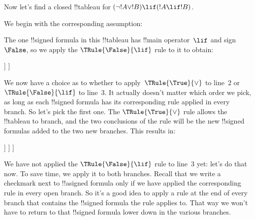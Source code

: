 \begin{ex}
Now let's find a closed !!{tableau} for $(\lnot !A \lor !B) \lif (!A
\lif !B)$.

We begin with the corresponding assumption:
\begin{oltableau}
  [\sFmla{\False}{(\lnot \formula{A} \lor \formula{B}) \lif
      (\formula{A} \lif \formula{B})}, just=\TAss]
\end{oltableau}
The one !!{signed formula} in this !!{tableau} has !!{main operator}~$\lif$
and sign~$\False$, so we apply the $\TRule{\False}{\lif}$ rule to it
to obtain:
\begin{oltableau}
  [\sFmla{\False}{(\lnot \formula{A} \lor \formula{B})
      \lif (\formula{A} \lif \formula{B})}, just=\TAss, checked
    [\sFmla{\True}{\lnot \formula{A} \lor \formula{B}},
      just={\TRule{\False}{\lif}[1]}
      [\sFmla{\False}{(\formula{A} \lif \formula{B})},
        just={\TRule{\False}{\lif}[1]}
      ]
    ]
  ]
\end{oltableau}
We now have a choice as to whether to apply~$\TRule{\True}{\lor}$ to
line~$2$ or $\TRule{\False}{\lif}$ to line~$3$. It actually doesn't
matter which order we pick, as long as each !!{signed formula} has its
corresponding rule applied in every branch. So let's pick the first
one. The $\TRule{\True}{\lor}$ rule allows the !!{tableau} to branch,
and the two conclusions of the rule will be the new !!{signed formula}s
added to the two new branches. This results in:
\begin{oltableau}
  [\sFmla{\False}{(\lnot \formula{A} \lor \formula{B}) \lif
      (\formula{A} \lif \formula{B})}, just=\TAss, checked
    [\sFmla{\True}{\lnot \formula{A} \lor \formula{B}},
      just={\TRule{\False}{\lif}[1]}, checked
      [\sFmla{\False}{(\formula{A} \lif \formula{B})},
        just={\TRule{\False}{\lif}[1]}
        [\sFmla{\True}{\lnot \formula{A}}, just={\TRule{\True}{\lor}[2]}]
        [\sFmla{\True}{\formula{B}}, just={\TRule{\True}{\lor}[2]}]
      ]
    ]
  ]
\end{oltableau}
We have not applied the $\TRule{\False}{\lif}$ rule to line~$3$ yet:
let's do that now.  To save time, we apply it to both branches.
Recall that we write a checkmark next to !!a{signed formula} only if
we have applied the corresponding rule in every open branch. So it's a
good idea to apply a rule at the end of every branch that contains the
!!{signed formula} the rule applies to. That way we won't have to
return to that !!{signed formula} lower down in the various branches.
\begin{oltableau}

\end{oltableau}
\end{ex}
